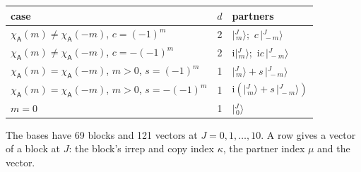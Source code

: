 \documentclass[10pt,a4paper]{article}
\numberwithin{equation}{section}
\newcommand{\grp}[1]{\mathsf{#1}}
\newcommand{\iunit}{\mathrm{i}}
\newcommand{\chiA}{\chi_{\grp{A}}}
\newcommand{\mult}{\kappa}
\newcommand{\intx}{\mu}
\newcommand{\jm}[2]{\bigl\lvert{}^{#1}_{\,#2}\bigr\rangle}
\begin{document}
\begin{center}\begin{tabular}{@{}lrl@{}}\toprule
case & $d$ & partners\\\midrule
$\chiA(m) \ne \chiA(-m)$, $c = (-1)^m$ & 2 & $\jm{J}{m}$;\ $c\,\jm{J}{-m}$\\
$\chiA(m) \ne \chiA(-m)$, $c = -(-1)^m$ & 2 & $\iunit\jm{J}{m}$;\ $\iunit c\,\jm{J}{-m}$\\
$\chiA(m) = \chiA(-m)$, $m > 0$, $s = (-1)^m$ & 1 & $\jm{J}{m} + s\,\jm{J}{-m}$\\
$\chiA(m) = \chiA(-m)$, $m > 0$, $s = -(-1)^m$ & 1 & $\iunit(\jm{J}{m} + s\,\jm{J}{-m})$\\
$m = 0$ & 1 & $\jm{J}{0}$\\
\bottomrule\end{tabular}\end{center}
The bases have 69 blocks and 121 vectors at $J = 0, 1, \dots, 10$. \label{n:head.vector}A row gives a vector of a block at $J$: the block's irrep and copy index $\mult$, the partner index $\intx$ and the vector.
\end{document}
